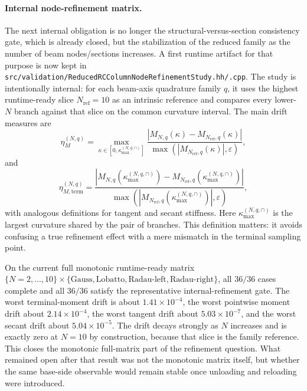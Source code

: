 \paragraph{Internal node-refinement matrix.}
The next internal obligation is no longer the structural-versus-section
consistency gate, which is already closed, but the stabilization of the
reduced family as the number of beam nodes/sections increases.  A first
runtime artifact for that purpose is now kept in
\texttt{src/validation/ReducedRCColumnNodeRefinementStudy.hh/.cpp}.  The
study is intentionally internal: for each beam-axis quadrature family \(q\),
it uses the highest runtime-ready slice \(N_{\mathrm{ref}}=10\) as an
intrinsic reference and compares every lower-\(N\) branch against that slice
on the common curvature interval.  The main drift measures are
\begin{equation}
  \eta_{M}^{(N,q)}
  =
  \max_{\kappa \in [0,\kappa_{\max}^{(N,q,\cap)}]}
  \frac{|M_{N,q}(\kappa)-M_{N_{\mathrm{ref}},q}(\kappa)|}
       {\max(|M_{N_{\mathrm{ref}},q}(\kappa)|,\varepsilon)},
\end{equation}
and
\begin{equation}
  \eta_{M,\mathrm{term}}^{(N,q)}
  =
  \frac{|M_{N,q}(\kappa_{\max}^{(N,q,\cap)})-
         M_{N_{\mathrm{ref}},q}(\kappa_{\max}^{(N,q,\cap)})|}
       {\max(|M_{N_{\mathrm{ref}},q}(\kappa_{\max}^{(N,q,\cap)})|,\varepsilon)},
\end{equation}
with analogous definitions for tangent and secant stiffness.  Here
\(\kappa_{\max}^{(N,q,\cap)}\) is the largest curvature shared by the pair of
branches.  This definition matters: it avoids confusing a true refinement
effect with a mere mismatch in the terminal sampling point.

On the current full monotonic runtime-ready matrix
\(\{N=2,\dots,10\}\times\{\text{Gauss},\text{Lobatto},\text{Radau-left},\text{Radau-right}\}\),
all \(36/36\) cases complete and all \(36/36\) satisfy the representative
internal-refinement gate.  The worst terminal-moment drift is about
\(1.41\times 10^{-4}\), the worst pointwise moment drift about
\(2.14\times 10^{-4}\), the worst tangent drift about
\(5.03\times 10^{-7}\), and the worst secant drift about
\(5.04\times 10^{-5}\).  The drift decays strongly as \(N\) increases and is
exactly zero at \(N=10\) by construction, because that slice is the family
reference.  This closes the monotonic full-matrix part of the refinement
question. What remained open after that result was not the monotonic matrix
itself, but whether the same base-side observable would remain stable once
unloading and reloading were introduced.

